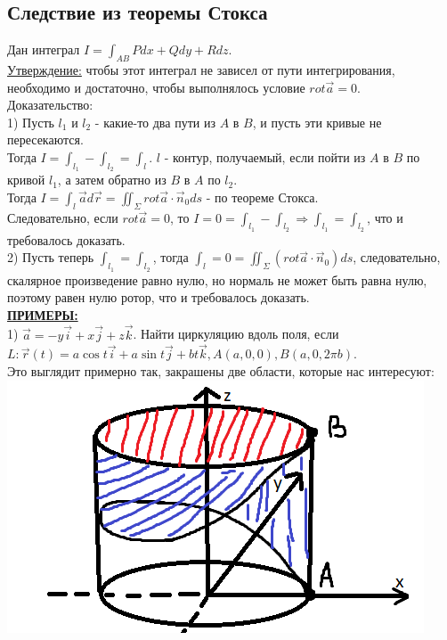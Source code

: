 \documentclass[12pt]{article}
\begin{document}
\subsection{Следствие из теоремы Стокса}
Дан интеграл $I = \int_{AB} Pdx + Qdy + Rdz$. \\
\uline{Утверждение:} чтобы этот интеграл не зависел от пути интегрирования, необходимо и достаточно, чтобы выполнялось условие  $rot \overrightarrow{a} = 0$.\\
Доказательство:\\
1) Пусть $l_1$ и $l_2$ - какие-то два пути из $A$ в $B$, и пусть эти кривые не пересекаются.\\
Тогда $I = \int_{l_1} - \int_{l_2} = \int_l$. $l$ - контур, получаемый, если пойти из $A$ в $B$ по кривой $l_1$, а затем обратно из $B$ в $A$ по $l_2$.\\
Тогда $I = \int_l \overrightarrow{a} d \overrightarrow{r} = \iint_{\Sigma} rot \overrightarrow{a} \cdot \overrightarrow{n}_0 ds$ - по теореме Стокса.\\
Следовательно, если $rot \overrightarrow{a} = 0$, то $I = 0 = \int_{l_1} - \int_{l_2} \Rightarrow \int_{l_1} = \int_{l_2}$, что и требовалось доказать.\\
2) Пусть теперь $\int_{l_1} = \int_{l_2}$, тогда $\int_l = 0 = \iint_{\Sigma} (rot \overrightarrow{a} \cdot \overrightarrow{n}_0) ds$, следовательно, скалярное произведение равно нулю, но нормаль не может быть равна нулю, поэтому равен нулю ротор, что и требовалось доказать.\\
\uline{\textbf{ПРИМЕРЫ:}}\\
1) $\overrightarrow{a} = -y \overrightarrow{i} + x \overrightarrow{j} + z \overrightarrow{k}$. Найти циркуляцию вдоль поля, если\\
$L: \overrightarrow{r}(t) = a \cos t \overrightarrow{i} + a \sin t \overrightarrow{j} + b t \overrightarrow{k}, A(a,0,0), B(a,0,2 \pi b)$.\\
Это выглядит примерно так, закрашены две области, которые нас интересуют:\\
\includegraphics{stokesExample1}\\
\end{document}
